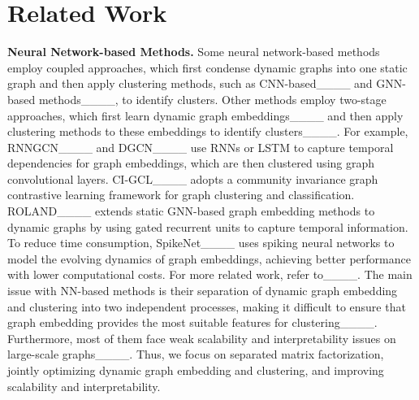 \section{Related Work}
\label{related}

\textbf{Neural Network-based Methods.} 
Some neural network-based methods employ coupled approaches, which first condense dynamic graphs into one static graph and then apply clustering methods, such as CNN-based____ and GNN-based 
methods____, to identify clusters. 
Other methods employ two-stage approaches, which first learn dynamic graph embeddings____ and then apply clustering methods to these  embeddings to identify clusters____.   
For example, RNNGCN____ and DGCN____ use RNNs or LSTM to capture temporal dependencies for graph embeddings, which are then clustered using graph convolutional layers. 
CI-GCL____ adopts a community invariance graph contrastive learning framework for graph clustering and classification.  
ROLAND____ extends static GNN-based graph embedding methods to dynamic graphs by using gated recurrent units to capture temporal information. 
To reduce time consumption, SpikeNet____ uses spiking neural networks to model the evolving dynamics of graph embeddings, achieving better performance with lower computational costs. For more related work, refer to____. 
The main issue with NN-based methods is their separation of dynamic graph embedding and clustering into two independent processes, making it difficult to ensure that graph embedding provides the most suitable features for clustering____. Furthermore, most of them face weak scalability and interpretability issues on large-scale graphs____. 
Thus, we focus on separated matrix factorization, jointly optimizing dynamic graph embedding and clustering, and improving scalability and interpretability. %

